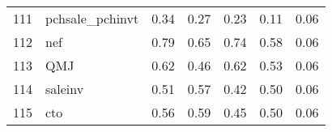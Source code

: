 \documentclass[12pt]{article}
\begin{document}
\begin{footnotesize}
\begin{longtable}{rl|c|c|c|c|c}
				111                  & pchsale\_pchinvt            & 0.34                             & 0.27                                                                                          & 0.23                                                                                          & 0.11                                                                                          & 0.06                                                                                                   \\
				112                  & nef                         & 0.79                             & 0.65                                                                                          & 0.74                                                                                          & 0.58                                                                                          & 0.06                                                                                                   \\
				113                  & QMJ                         & 0.62                             & 0.46                                                                                          & 0.62                                                                                          & 0.53                                                                                          & 0.06                                                                                                   \\
				114                  & saleinv                     & 0.51                             & 0.57                                                                                          & 0.42                                                                                          & 0.50                                                                                          & 0.06                                                                                                   \\
				115                  & cto                         & 0.56                             & 0.59                                                                                          & 0.45                                                                                          & 0.50                                                                                          & 0.06                                                                                                   \\

\end{longtable}
\end{footnotesize}
\end{document}

